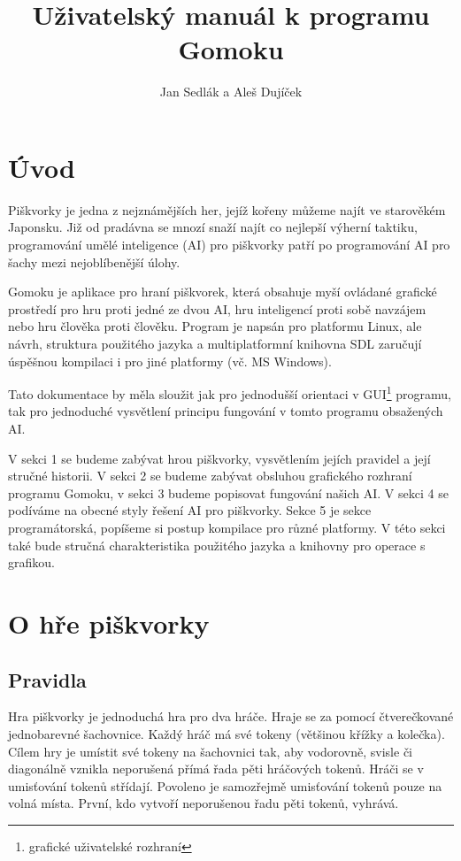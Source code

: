 \documentclass[a4paper,11pt,titlepage]{article}
\author{Jan Sedlák a Aleš Dujíček}
\title{Uživatelský manuál k programu Gomoku}
\begin{document}
\maketitle
\tableofcontents
\newpage
\section{Úvod}
Piškvorky je jedna z nejznámějších her, jejíž kořeny můžeme najít ve starověkém Japonsku. Již od pradávna se mnozí snaží najít co nejlepší výherní taktiku, programování umělé inteligence (AI) pro piškvorky patří po programování AI pro šachy mezi nejoblíbenější úlohy. 

Gomoku je aplikace pro hraní piškvorek, která obsahuje myší ovládané grafické prostředí pro hru proti jedné ze dvou AI, hru inteligencí proti sobě navzájem nebo hru člověka proti člověku. Program je napsán pro platformu Linux, ale návrh, struktura použitého jazyka a multiplatformní knihovna SDL zaručují úspěšnou kompilaci i pro jiné platformy (vč. MS Windows).

Tato dokumentace by měla sloužit jak pro jednodušší orientaci v GUI\footnote{grafické uživatelské rozhraní} programu, tak pro jednoduché vysvětlení principu fungování v tomto programu obsažených AI.

V sekci 1 se budeme zabývat hrou piškvorky, vysvětlením jejích pravidel a její stručné historii. V sekci 2 se budeme zabývat obsluhou grafického rozhraní programu Gomoku, v sekci 3 budeme popisovat fungování našich AI. V sekci 4 se podíváme na obecné styly řešení AI pro piškvorky. Sekce 5 je sekce programátorská, popíšeme si postup kompilace pro různé platformy. V této sekci také bude stručná charakteristika použitého jazyka a knihovny pro operace s grafikou.
\newpage
\section{O hře piškvorky}
\subsection{Pravidla}
Hra piškvorky je jednoduchá hra pro dva hráče. Hraje se za pomocí čtve\-reč\-ko\-va\-né jednobarevné šachovnice. Každý hráč má své tokeny (většinou křížky a kolečka). Cílem hry je umístit své tokeny na šachovnici tak, aby vodorovně, svisle či diagonálně vznikla neporušená přímá řada pěti hráčových tokenů. Hráči se v umisťování tokenů střídají. Povoleno je samozřejmě umisťování tokenů pouze na volná místa. První, kdo vytvoří neporušenou řadu pěti tokenů, vyhrává. 
\end{document}
